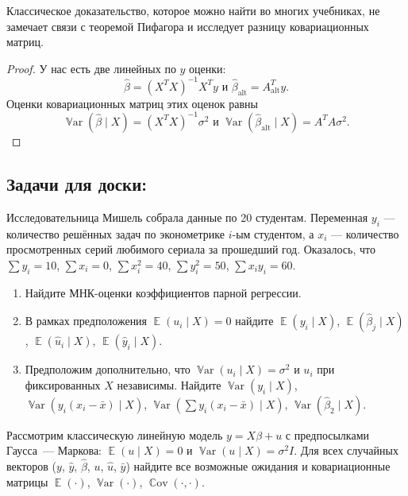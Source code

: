 \documentclass[12pt]{article}
\DeclareMathOperator{\Cov}{\mathbb{C}ov}
\DeclareMathOperator{\Var}{\mathbb{V}ar}
\DeclareMathOperator{\E}{\mathbb{E}}
\newcommand{\hb}{\hat{\beta}}
\newcommand{\hy}{\hat{y}}
\newcommand{\alt}{\text{alt}}
\newenvironment{sol}{}{}
\begin{document}
Классическое доказательство, которое можно найти во многих учебниках, не замечает связи с теоремой Пифагора и исследует разницу ковариационных матриц. 
\begin{proof}
У нас есть две линейных по $y$ оценки:
\[
\hb = (X^TX)^{-1}X^T y \text{ и } \hb_{\alt} = A^T_{\alt} y.
\]
Оценки ковариационных матриц этих оценок равны 
\[
\Var(\hb \mid X) = (X^TX)^{-1} \sigma^2 \text{ и } \Var(\hb_{\alt} \mid X) = A^TA \sigma^2.
\]
\end{proof}



\subsection{Задачи для доски:}

\begin{problem}
Исследовательница Мишель собрала данные по 20 студентам. 
Переменная $y_i$ --- количество решённых задач по эконометрике $i$-ым студентом, 
а $x_i$ --- количество просмотренных серий любимого сериала за прошедший год. 
Оказалось, что $\sum y_i = 10$, $\sum x_i = 0$, $\sum x_i^2 = 40$, $\sum y_i^2 = 50$, $\sum x_i y_i = 60$.

\begin{enumerate}
\item Найдите МНК-оценки коэффициентов парной регрессии.
\item В рамках предположения $\E(u_i \mid X) = 0$ найдите $\E(y_i \mid X)$, $\E(\hb_j \mid X)$, $\E(\hat u_i \mid X)$, $\E(\hat y_i \mid X)$.
\item Предположим дополнительно, что $\Var(u_i \mid X)=\sigma^2$ и $u_i$ при фиксированных $X$ независимы. 
Найдите $\Var(y_i \mid X)$, $\Var(y_i (x_i - \bar x) \mid X)$, $\Var(\sum y_i (x_i - \bar x) \mid X)$, $\Var(\hb_2 \mid X)$.
\end{enumerate}
\begin{sol}

  \end{sol}
\end{problem}

\begin{problem}
Рассмотрим классическую линейную модель $y=X\beta + u$ с предпосылками Гаусса~--- Маркова: $\E(u \mid X) = 0$ и $\Var(u \mid X) = \sigma^2 I$.
Для всех случайных векторов ($y$, $\hy$, $\hb$, $u$, $\hat u$, $\bar y$) найдите все возможные ожидания и ковариационные матрицы
$\E(\cdot)$, $\Var(\cdot)$, $\Cov(\cdot, \cdot)$.
\begin{sol}
\end{sol}
\end{problem}
\end{document}
